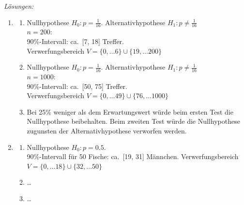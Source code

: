 \clearpage
\emph{Lösungen:}
\begin{enumerate}
    \item
          \begin{enumerate}
              \item Nullhypothese \( H_0: p = \frac{1}{16} \). Alternativhypothese \(H_1: p\neq\frac{1}{16}\) \\
                    \( n = 200 \):\\
                    90\%-Intervall: ca.\ [7, 18] Treffer. \\
                    Verwerfungsbereich \(V=\{0, \dots 6\} \cup \{19, \dots 200\}\)

              \item Nullhypothese \( H_0: p = \frac{1}{16} \). Alternativhypothese \(H_1: p\neq\frac{1}{16}\) \\
                    \( n = 1000 \):\\
                    90\%-Intervall: ca.\ [50, 75] Treffer. \\
                    Verwerfungsbereich \(V=\{0, \dots 49\} \cup \{76, \dots 1000\}\)

              \item Bei 25\% weniger als dem Erwartungswert würde beim ersten Test die Nullhypothese beibehalten. Beim zweiten Test würde die Nullhypothese zugunsten der Alternativhypothese verworfen werden.
          \end{enumerate}

    \item
          \begin{enumerate}
              \item Nullhypothese \( H_0: p = 0.5 \). \\
                    90\%-Intervall für 50 Fische: ca.\ [19, 31] Männchen.
                    Verwerfungsbereich \(V=\{0, \dots 18\} \cup \{32, \dots 50\}\)

              \item \dots

              \item \dots
          \end{enumerate}
\end{enumerate}

\clearpage

























